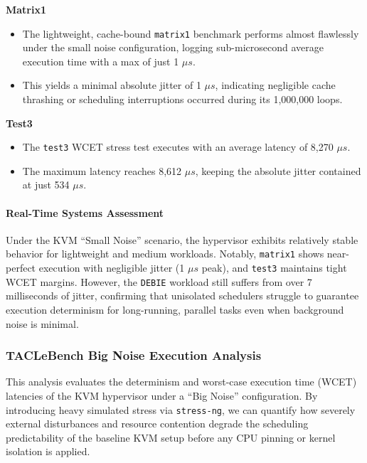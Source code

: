 \textbf{Matrix1}

\begin{itemize}
\item
  The lightweight, cache-bound \texttt{matrix1} benchmark performs
  almost flawlessly under the small noise configuration, logging
  sub-microsecond average execution time with a max of just 1 $\mu s$.
\item
  This yields a minimal absolute jitter of 1 $\mu s$, indicating negligible
  cache thrashing or scheduling interruptions occurred during its
  1,000,000 loops.
\end{itemize}

\textbf{Test3}

\begin{itemize}
\item
  The \texttt{test3} WCET stress test executes with an average latency
  of 8,270 $\mu s$.
\item
  The maximum latency reaches 8,612 $\mu s$, keeping the absolute jitter
  contained at just 534 $\mu s$.
\end{itemize}

\paragraph{Real-Time Systems
Assessment}\label{real-time-systems-assessment-1}

Under the KVM ``Small Noise'' scenario, the hypervisor exhibits
relatively stable behavior for lightweight and medium workloads.
Notably, \texttt{matrix1} shows near-perfect execution with negligible
jitter (1 $\mu s$ peak), and \texttt{test3} maintains tight WCET margins.
However, the \texttt{DEBIE} workload still suffers from over 7
milliseconds of jitter, confirming that unisolated schedulers struggle
to guarantee execution determinism for long-running, parallel tasks even
when background noise is minimal.

\subsubsection{TACLeBench Big Noise Execution
Analysis}\label{taclebench-big-noise-execution-analysis}

This analysis evaluates the determinism and worst-case execution time
(WCET) latencies of the KVM hypervisor under a ``Big Noise''
configuration. By introducing heavy simulated stress via
\texttt{stress-ng}, we can quantify how severely external disturbances
and resource contention degrade the scheduling predictability of the
baseline KVM setup before any CPU pinning or kernel isolation is
applied.

